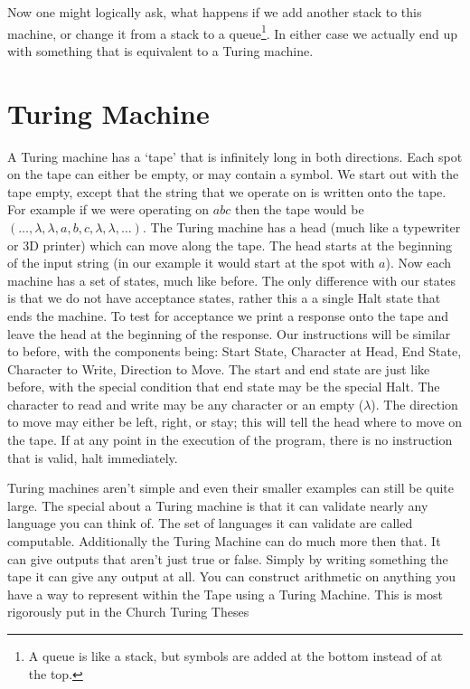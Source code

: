 \documentclass{article}
\begin{document}
	Now one might logically ask, what happens if we add another stack to this machine, or change it from a stack to a queue\footnote{A queue is like a stack, but symbols are added at the bottom instead of at the top.}. In either case we actually end up with something that is equivalent to a Turing machine.
	
	\section{Turing Machine}
	A Turing machine has a `tape' that is infinitely long in both directions. Each spot on the tape can either be empty, or may contain a symbol. We start out with the tape empty, except that the string that we operate on is written onto the tape. For example if we were operating on $abc$ then the tape would be $(\ldots,\lambda,\lambda,a,b,c,\lambda,\lambda,\ldots)$. The Turing machine has a head (much like a typewriter or 3D printer) which can move along the tape. The head starts at the beginning of the input string (in our example it would start at the spot with $a$). Now each machine has a set of states, much like before. The only difference with our states is that we do not have acceptance states, rather this a a single Halt state that ends the machine. To test for acceptance we print a response onto the tape and leave the head at the beginning of the response. Our instructions will be similar to before, with the components being: Start State, Character at Head, End State, Character to Write, Direction to Move. The start and end state are just like before, with the special condition that end state may be the special Halt. The character to read and write may be any character or an empty ($\lambda$). The direction to move may either be left, right, or stay; this will tell the head where to move on the tape. If at any point in the execution of the program, there is no instruction that is valid, halt immediately.
	
	Turing machines aren't simple and even their smaller examples can still be quite large. The special about a Turing machine is that it can validate nearly any language you can think of. The set of languages it can validate are called computable. Additionally the Turing Machine can do much more then that. It can give outputs that aren't just true or false. Simply by writing something the tape it can give any output at all. You can construct arithmetic on anything you have a way to represent within the Tape using a Turing Machine. This is most rigorously put in the Church Turing Theses
	
\end{document}
